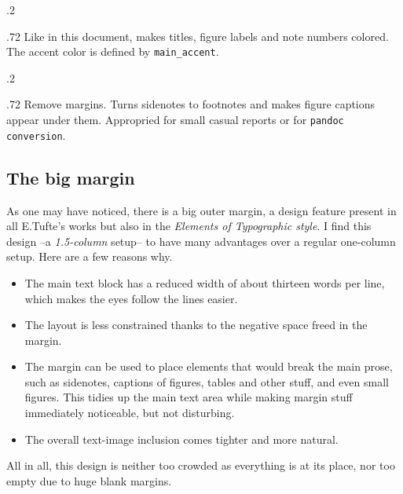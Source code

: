 \documentclass[
	a4paper,
	raggedright,
	twoside,
	12pt,
	colorful,
]{tufte-style-article}
\begin{document}
\smallskip
\begin{minipagewithmarginpars}[t]{.2\textwidth}
	\raggedleft
\end{minipagewithmarginpars}\hfill%
\begin{minipagewithmarginpars}[t]{.72\textwidth}
	Like in this document, makes titles, figure labels and note numbers colored. The accent color is defined by \texttt{main\_accent}.
\end{minipagewithmarginpars}
\smallskip
\begin{minipagewithmarginpars}[t]{.2\textwidth}
	\raggedleft
\end{minipagewithmarginpars}\hfill%
\begin{minipagewithmarginpars}[t]{.72\textwidth}
	Remove margins. Turns sidenotes to footnotes and makes figure captions appear under them. Appropried for small casual reports or for \texttt{pandoc conversion}.
\end{minipagewithmarginpars}


\subsection{The big margin}

As one may have noticed, there is a big outer margin, a design feature present in all E.Tufte's works but also in the \textit{Elements of Typographic style}. I find this design --a \textit{1.5-column} setup-- to have many advantages over a regular one-column setup. Here are a few reasons why.
\begin{itemize}\tightlist
	\item The main text block has a reduced width of about thirteen words per line, which makes the eyes follow the lines easier.

	\item The layout is less constrained thanks to the negative space freed in the margin.

	\item The margin can be used to place elements that would break the main prose, such as sidenotes, captions of figures, tables and other stuff, and even small figures. This tidies up the main text area while making margin stuff immediately noticeable, but not disturbing.

	\item The overall text-image inclusion comes tighter and more natural.
\end{itemize}
All in all, this design is neither too crowded as everything is at its place, nor too empty due to huge blank margins.
\end{document}
